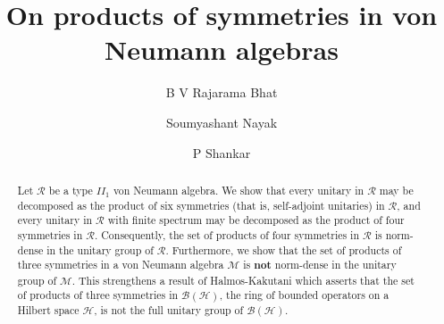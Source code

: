 \documentclass[12pt, preprint]{amsart}
\theoremstyle{definition}
\theoremstyle{remark}
\numberwithin{equation}{section}
\theoremstyle{ser}
\theoremstyle{serr}
\theoremstyle{ser}
\begin{document}
\title{On products of symmetries in von Neumann algebras}


\author{B V Rajarama Bhat}

\address{Statistics and Mathematics Unit\\
Indian Statistical Institute\\
 8th Mile, Mysore Road\\
  RVCE Post, Bengaluru\\
   Karnataka - 560 059, India}

\author{Soumyashant Nayak}
\address{Statistics and Mathematics Unit\\
Indian Statistical Institute\\
 8th Mile, Mysore Road\\
  RVCE Post, Bengaluru\\
   Karnataka - 560 059, India}

\author{P Shankar}
\address{ Department of Mathematics\\
Cochin University of Science and Technology\\
Kochi,
Kerala - 682022, India}

\begin{abstract}
Let $\mathscr{R}$ be a type $II_1$ von Neumann algebra. We show that every unitary in $\mathscr{R}$ may be decomposed as the product of six symmetries (that is, self-adjoint unitaries) in $\mathscr{R}$, and every unitary in $\mathscr{R}$ with finite spectrum may be decomposed as the product of four symmetries in $\mathscr{R}$. Consequently, the set of products of four symmetries in $\mathscr{R}$ is norm-dense in the unitary group of $\mathscr{R}$. Furthermore, we show that the set of products of three symmetries in a von Neumann algebra $\mathscr{M}$ is {\bf not} norm-dense in the unitary group of $\mathscr{M}$. This strengthens a result of Halmos-Kakutani which asserts that the set of products of three symmetries in $\mathcal{B}(\mathscr{H})$, the ring of bounded operators on a Hilbert space $\mathscr{H}$, is not the full unitary group of $\mathcal{B}(\mathscr{H})$.
\end{abstract}



\end{document}
